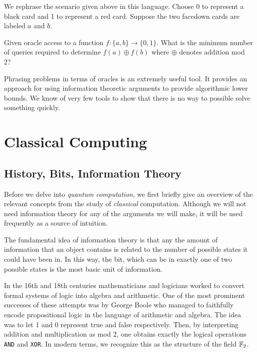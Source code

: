         We rephrase the scenario given above in this language.  Choose 0 to represent a black card and 1 to
        represent a red card. Suppose the two facedown cards are labeled $a$ and $b$.   
       
        \begin{example} 
            Given oracle access to a function $f: \{a, b\} \rightarrow \{0, 1\}$. What is the minimum number of
            queries required to determine $f(a) \oplus f(b)$ where $\oplus$ denotes addition mod 2?
        \end{example}

        

        Phrasing problems in terms of oracles is an extremely useful tool. It provides an approach for using 
        information theoretic arguments to provide algorithmic lower bounds. We know of very few tools to show that 
        there is no way to possible solve something quickly.

        \begin{example}
        \end{example}


        

\section{Classical Computing}
        \subsection{History, Bits, Information Theory}
        Before we delve into  \emph{quantum computation}, we first briefly give an overview of the relevant 
        concepts from the study of \emph{classical} computation. Although we will not need information theory for 
        any of the arguments we will make, it will be used frequently as a source of intuition.

        The fundamental idea of information theory is that any the amount of information that an object contains is 
        related to the number of possible states it could have been in. In this way, the bit, which can be in 
        exactly one of two possible states is the most basic unit of information.


        In the 16th and 18th centuries mathematicians and logicians worked to convert formal systems of logic into 
        algebra and arithmetic. One of the most prominent successes of these attempts was by George Boole who 
        managed to faithfully encode propositional logic in the language of arithmetic and algebra. The idea was to 
        let 1 and 0 represent true and false respectively. Then, by interpreting addition and multiplication as mod 
        2, one obtains exactly the logical operations \texttt{AND} and  \texttt{XOR}. In modern terms, we recognize 
        this as the structure of the field $\mathbb{F}_2$. 
        
